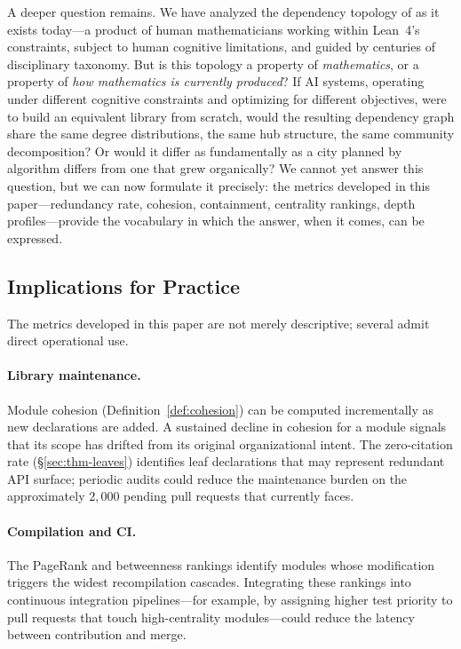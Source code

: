 A deeper question remains. We have analyzed the dependency topology of  as it exists today---a product of human mathematicians working within Lean~4's constraints, subject to human cognitive limitations, and guided by centuries of disciplinary taxonomy. But is this topology a property of \emph{mathematics}, or a property of \emph{how mathematics is currently produced}? If AI systems, operating under different cognitive constraints and optimizing for different objectives, were to build an equivalent library from scratch, would the resulting dependency graph share the same degree distributions, the same hub structure, the same community decomposition? Or would it differ as fundamentally as a city planned by algorithm differs from one that grew organically? We cannot yet answer this question, but we can now formulate it precisely: the metrics developed in this paper---redundancy rate, cohesion, containment, centrality rankings, depth profiles---provide the vocabulary in which the answer, when it comes, can be expressed.

\subsection{Implications for Practice}
\label{sec:practice}

The metrics developed in this paper are not merely descriptive; several admit direct operational use.

\paragraph{Library maintenance.} Module cohesion (Definition~\ref{def:cohesion}) can be computed incrementally as new declarations are added. A sustained decline in cohesion for a module signals that its scope has drifted from its original organizational intent. The zero-citation rate (\S\ref{sec:thm-leaves}) identifies leaf declarations that may represent redundant API surface; periodic audits could reduce the maintenance burden on the approximately $2{,}000$ pending pull requests that  currently faces.

\paragraph{Compilation and CI.} The PageRank and betweenness rankings identify modules whose modification triggers the widest recompilation cascades. Integrating these rankings into continuous integration pipelines---for example, by assigning higher test priority to pull requests that touch high-centrality modules---could reduce the latency between contribution and merge.

